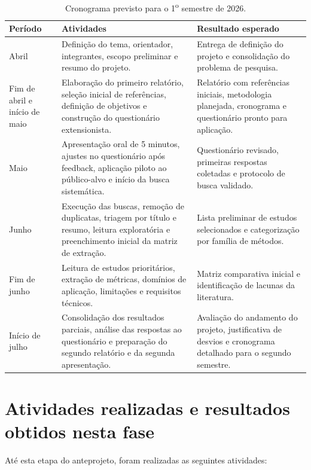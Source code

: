 \begin{table}[!htbp]
\centering
\caption{Cronograma previsto para o 1\textsuperscript{o} semestre de 2026.}
\begin{tabularx}{\textwidth}{>{\raggedright\arraybackslash}p{3.2cm}X>{\raggedright\arraybackslash}p{4.2cm}}
\toprule
\textbf{Período} & \textbf{Atividades} & \textbf{Resultado esperado} \\
\midrule
Abril & Definição do tema, orientador, integrantes, escopo preliminar e resumo do projeto. & Entrega de definição do projeto e consolidação do problema de pesquisa. \\
\addlinespace
Fim de abril e início de maio & Elaboração do primeiro relatório, seleção inicial de referências, definição de objetivos e construção do questionário extensionista. & Relatório com referências iniciais, metodologia planejada, cronograma e questionário pronto para aplicação. \\
\addlinespace
Maio & Apresentação oral de 5 minutos, ajustes no questionário após feedback, aplicação piloto ao público-alvo e início da busca sistemática. & Questionário revisado, primeiras respostas coletadas e protocolo de busca validado. \\
\addlinespace
Junho & Execução das buscas, remoção de duplicatas, triagem por título e resumo, leitura exploratória e preenchimento inicial da matriz de extração. & Lista preliminar de estudos selecionados e categorização por família de métodos. \\
\addlinespace
Fim de junho & Leitura de estudos prioritários, extração de métricas, domínios de aplicação, limitações e requisitos técnicos. & Matriz comparativa inicial e identificação de lacunas da literatura. \\
\addlinespace
Início de julho & Consolidação dos resultados parciais, análise das respostas ao questionário e preparação do segundo relatório e da segunda apresentação. & Avaliação do andamento do projeto, justificativa de desvios e cronograma detalhado para o segundo semestre. \\
\bottomrule
\end{tabularx}
\end{table}

\newpage

\section{Atividades realizadas e resultados obtidos nesta fase}

Até esta etapa do anteprojeto, foram realizadas as seguintes atividades:

